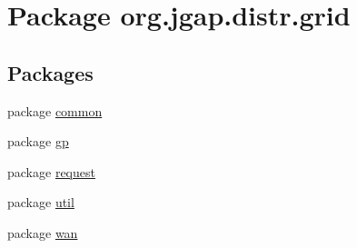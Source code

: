 \hypertarget{namespaceorg_1_1jgap_1_1distr_1_1grid}{\section{Package org.\-jgap.\-distr.\-grid}
\label{namespaceorg_1_1jgap_1_1distr_1_1grid}
}
\subsection*{Packages}
\begin{DoxyCompactItemize}
\item 
package \hyperlink{namespaceorg_1_1jgap_1_1distr_1_1grid_1_1common}{common}
\item 
package \hyperlink{namespaceorg_1_1jgap_1_1distr_1_1grid_1_1gp}{gp}
\item 
package \hyperlink{namespaceorg_1_1jgap_1_1distr_1_1grid_1_1request}{request}
\item 
package \hyperlink{namespaceorg_1_1jgap_1_1distr_1_1grid_1_1util}{util}
\item 
package \hyperlink{namespaceorg_1_1jgap_1_1distr_1_1grid_1_1wan}{wan}
\end{DoxyCompactItemize}
